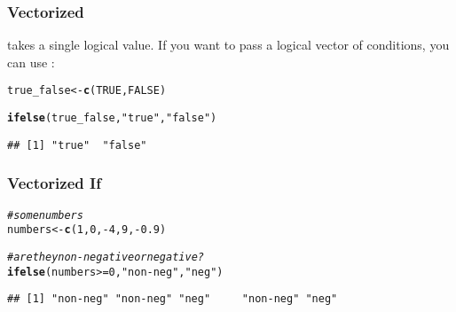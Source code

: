 \documentclass[12pt]{beamer}\usepackage[]{graphicx}\usepackage[]{color}
\makeatletter
\newcommand{\hlnum}[1]{\textcolor[rgb]{0.686,0.059,0.569}{#1}}%
\newcommand{\hlstr}[1]{\textcolor[rgb]{0.192,0.494,0.8}{#1}}%
\newcommand{\hlcom}[1]{\textcolor[rgb]{0.678,0.584,0.686}{\textit{#1}}}%
\newcommand{\hlopt}[1]{\textcolor[rgb]{0,0,0}{#1}}%
\newcommand{\hlstd}[1]{\textcolor[rgb]{0.345,0.345,0.345}{#1}}%
\newcommand{\hlkwb}[1]{\textcolor[rgb]{0.69,0.353,0.396}{#1}}%
\newcommand{\hlkwd}[1]{\textcolor[rgb]{0.737,0.353,0.396}{\textbf{#1}}}%
\newenvironment{kframe}{%
 \def\at@end@of@kframe{}%
 \ifinner\ifhmode%
  \def\at@end@of@kframe{\end{minipage}}%
  \begin{minipage}{\columnwidth}%
 \fi\fi%
 \def\FrameCommand##1{\hskip\@totalleftmargin \hskip-\fboxsep
 \colorbox{shadecolor}{##1}\hskip-\fboxsep
     \hskip-\linewidth \hskip-\@totalleftmargin \hskip\columnwidth}%
 \MakeFramed {\advance\hsize-\width
   \@totalleftmargin\z@ \linewidth\hsize
   \@setminipage}}%
 {\par\unskip\endMakeFramed%
 \at@end@of@kframe}
\newenvironment{knitrout}{}{} %
\makeatother
\begin{document}

\begin{frame}[fragile]
\frametitle{Vectorized }

 takes a single logical value. If you want to pass a logical vector of conditions, you can use {\hilit {}}:
\begin{knitrout}\footnotesize
{}\color{fgcolor}\begin{kframe}
\begin{alltt}
\hlstd{true_false} \hlkwb{<-} \hlkwd{c}\hlstd{(}\hlnum{TRUE}\hlstd{,} \hlnum{FALSE}\hlstd{)}

\hlkwd{ifelse}\hlstd{(true_false,} \hlstr{"true"}\hlstd{,} \hlstr{"false"}\hlstd{)}
\end{alltt}
\begin{verbatim}
## [1] "true"  "false"
\end{verbatim}
\end{kframe}
\end{knitrout}

\end{frame}


\begin{frame}[fragile]
\frametitle{Vectorized If}

\begin{knitrout}\footnotesize
{}\color{fgcolor}\begin{kframe}
\begin{alltt}
\hlcom{# some numbers}
\hlstd{numbers} \hlkwb{<-} \hlkwd{c}\hlstd{(}\hlnum{1}\hlstd{,} \hlnum{0}\hlstd{,} \hlopt{-}\hlnum{4}\hlstd{,} \hlnum{9}\hlstd{,} \hlopt{-}\hlnum{0.9}\hlstd{)}

\hlcom{# are they non-negative or negative?}
\hlkwd{ifelse}\hlstd{(numbers} \hlopt{>=} \hlnum{0}\hlstd{,} \hlstr{"non-neg"}\hlstd{,} \hlstr{"neg"}\hlstd{)}
\end{alltt}
\begin{verbatim}
## [1] "non-neg" "non-neg" "neg"     "non-neg" "neg"
\end{verbatim}
\end{kframe}
\end{knitrout}

\end{frame}

\end{document}
